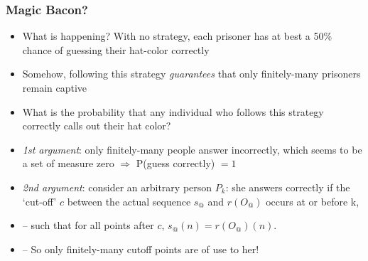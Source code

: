 \begin{frame}
\frametitle{Magic Bacon?}

\begin{itemize}[<+->]
\item What is happening? With no strategy, each prisoner has at best a 50\% chance of guessing their hat-color correctly

\item Somehow, following this strategy \textit{guarantees} that only finitely-many prisoners remain captive

\item What is the probability that any individual who follows this strategy correctly calls out their hat color?

\item[] \textit{1st argument}: only finitely-many people answer incorrectly, which seems to be a set of measure zero $\Rightarrow$ P(guess correctly) $=1$

\item[] \textit{2nd argument}: consider an arbitrary person $P_k$: she answers correctly if the `cut-off' $c$ between the actual sequence $s_@$ and $r(O_@)$ occurs at or before k, 
\item[] -- such that for all points after $c$, $s_@(n) = r(O_@)(n)$. 
\item[] -- So only finitely-many cutoff points are of use to her!



\end{itemize}
\end{frame}

